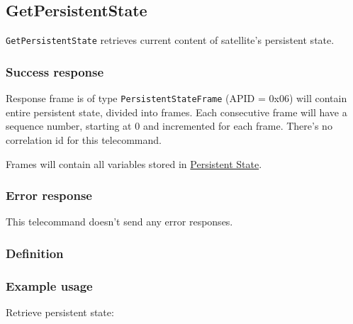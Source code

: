 \subsection{GetPersistentState}
\label{sec:tc-GetPersistentState}
\texttt{GetPersistentState} retrieves current content of satellite's persistent state. 

\subsubsection{Success response}
Response frame is of type \texttt{PersistentStateFrame} (APID = 0x06) will contain entire persistent state, divided into frames. Each consecutive frame will have a sequence number, starting at 0 and incremented for each frame. There's no correlation id for this telecommand.

Frames will contain all variables stored in \hyperref[sec:ref-PersistentState]{Persistent State}.

\subsubsection{Error response}
This telecommand doesn't send any error responses.

\subsubsection{Definition}

\subsubsection{Example usage}
Retrieve persistent state:


